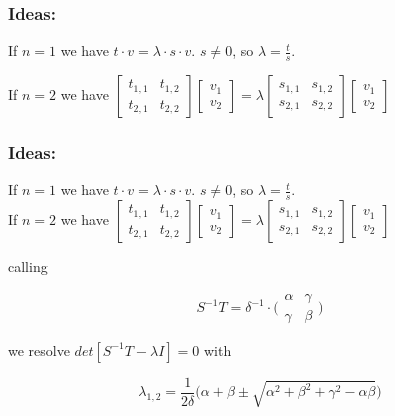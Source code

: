 \documentclass{beamer}
\theoremstyle{definition} \newtheorem{de}{Def}
\theoremstyle{remark} \newtheorem{os}[de]{Remark}
\theoremstyle{plain} \newtheorem{te}[de]{Teo}
\theoremstyle{plain} \newtheorem{co}[de]{Cor}
\theoremstyle{plain} \newtheorem{pr}[de]{Prop}
\theoremstyle{plain} \newtheorem{lem}[de]{Lemm}
\theoremstyle{remark} \newtheorem{rem}[de]{Remark}
\begin{document}
\begin{frame}
  \frametitle{Ideas:}
  If $n=1$ we have $t\cdot v=\lambda\cdot s\cdot v$. $s\ne 0$, so 
  $\lambda= \frac{t}{s}$.\\
  
  \pause
  
  If $n=2$ we have $\begin{bmatrix}t_{1,1}&t_{1,2}\\ t_{2,1} & t_{2,2}\end{bmatrix} \begin{bmatrix}v_{1} \\ v_{2}\end{bmatrix} = \lambda \begin{bmatrix}s_{1,1} & s_{1,2}\\ s_{2,1} & s_{2,2}\end{bmatrix} \begin{bmatrix}v_{1} \\ v_{2}\end{bmatrix}$


\end{frame}


\begin{frame}
  \frametitle{Ideas:}
  If $n=1$ we have $t\cdot v=\lambda\cdot s\cdot v$. $s\ne 0$, so 
  $\lambda= \frac{t}{s}$.\\
  
  If $n=2$ we have $\begin{bmatrix}t_{1,1}&t_{1,2}\\ t_{2,1} & t_{2,2}\end{bmatrix} \begin{bmatrix}v_{1} \\ v_{2}\end{bmatrix} = \lambda \begin{bmatrix}s_{1,1} & s_{1,2}\\ s_{2,1} & s_{2,2}\end{bmatrix} \begin{bmatrix}v_{1} \\ v_{2}\end{bmatrix}$
  
  
  calling 

  \begin{equation*}
    S^{-1}T = \delta^{-1} \cdot \Big( \begin{matrix} \alpha & \gamma \\ \gamma & \beta \end{matrix}\Big)
  \end{equation*}

  we resolve $det[ S^{-1}T - \lambda I ]=0$ with

  \begin{equation*}
    \lambda_{1,2} = \frac{1}{2\delta}  
  \big( \alpha+\beta \pm \sqrt{ \alpha^2 + \beta^2 + 
  \gamma^2 - \alpha\beta } \big)
  \end{equation*}

\end{frame}
\end{document}
